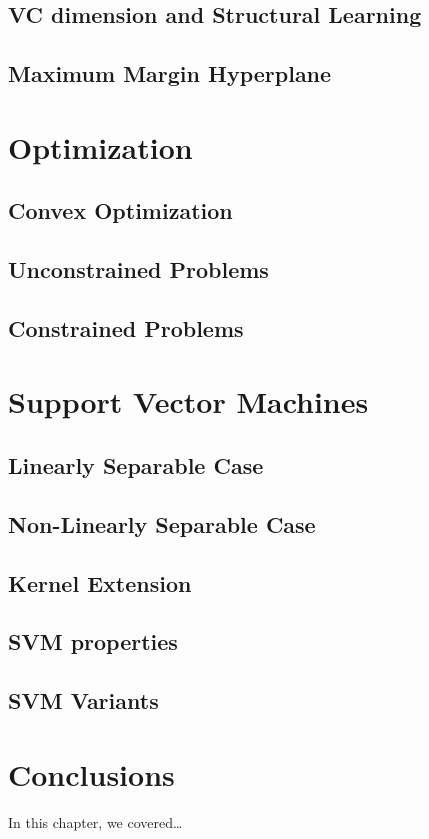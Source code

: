 \subsection{VC dimension and Structural Learning}


\subsection{Maximum Margin Hyperplane}







\section{Optimization}
\subsection{Convex Optimization}
\subsection{Unconstrained Problems}
\subsection{Constrained Problems}


\section{Support Vector Machines}
\subsection{Linearly Separable Case}
\subsection{Non-Linearly Separable Case}
\subsection{Kernel Extension}
\subsection{SVM properties}
\subsection{SVM Variants}

\section{Conclusions}\label{sec-conclusions-1}

In this chapter, we covered\dots
